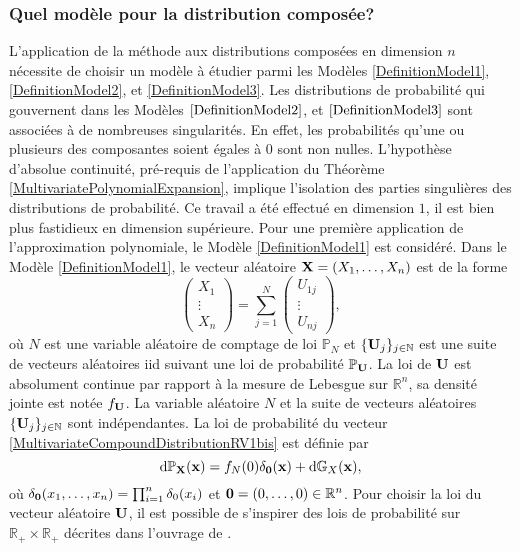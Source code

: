 \subsubsection{Quel modèle pour la distribution composée?}
L'application de la méthode aux distributions composées en dimension $n$ nécessite de choisir un modèle à étudier parmi les Modèles \ref{DefinitionModel1}, \ref{DefinitionModel2}, et \ref{DefinitionModel3}. Les distributions de probabilité qui gouvernent dans les Modèles $\ref{DefinitionModel2}$, et $\ref{DefinitionModel3}$ sont associées à de nombreuses singularités. En effet, les probabilités qu'une ou plusieurs des composantes soient égales à $0$ sont non nulles. L'hypothèse d'absolue continuité, pré-requis de l'application du Théorème \ref{MultivariatePolynomialExpansion}, implique l'isolation des parties singulières des distributions de probabilité. Ce travail a été effectué en dimension $1$, il est bien plus fastidieux en dimension supérieure. Pour une première application de l'approximation polynomiale, le Modèle \ref{DefinitionModel1} est considéré. Dans le Modèle \ref{DefinitionModel1}, le vecteur aléatoire $\bold{X}=(X_{1},\ldots,X_{n})$ est de la forme 
\begin{equation}\label{MultivariateCompoundDistributionRV1bis}
\left( \begin{array}{l}
X_1 \\
\vdots\\
X_n \end{array}
\right)  =
 \displaystyle
\sum_{j=1}^{N}
\left( \begin{array}{l}
U_{1j} \\
\vdots\\
U_{nj} 
\end{array}
\right),
\end{equation}
où $N$ est une variable aléatoire de comptage de loi $\mathbb{P}_{N}$ et $\{\bold{U}_{j}\}_{j\in\mathbb{N}}$ est une suite de vecteurs aléatoires \gls{iid} suivant une loi de probabilité $\mathbb{P}_{\bold{U}}$. La loi de $\bold{U}$ est absolument continue par rapport à la mesure de Lebesgue sur $\mathbb{R}^{n}$, sa densité jointe est notée $f_{\bold{U}}$. La variable aléatoire $N$ et la suite de vecteurs aléatoires $\{\bold{U}_{j}\}_{j\in\mathbb{N}}$ sont indépendantes. La loi de probabilité du vecteur \eqref{MultivariateCompoundDistributionRV1bis} est définie par 
\begin{equation}
\text{d}\mathbb{P}_{\bold{X}}(\bold{x})=f_{N}(0)\delta_{\bold{0}}(\bold{x})+\text{d}\mathbb{G}_{X}(\bold{x}),
\end{equation}
où $\delta_{\bold{0}}(x_{1},\ldots,x_{n})=\prod_{i=1}^{n}\delta_{0}(x_{i})$ et $\bold{0}=(0,\ldots,0)\in\mathbb{R}^{n}$. Pour choisir la loi du vecteur aléatoire $\bold{U}$,  il est possible de s'inspirer des lois de probabilité sur $\mathbb{R}_{+}\times\mathbb{R}_{+}$ décrites dans l'ouvrage de \citet{BaLa09}.

